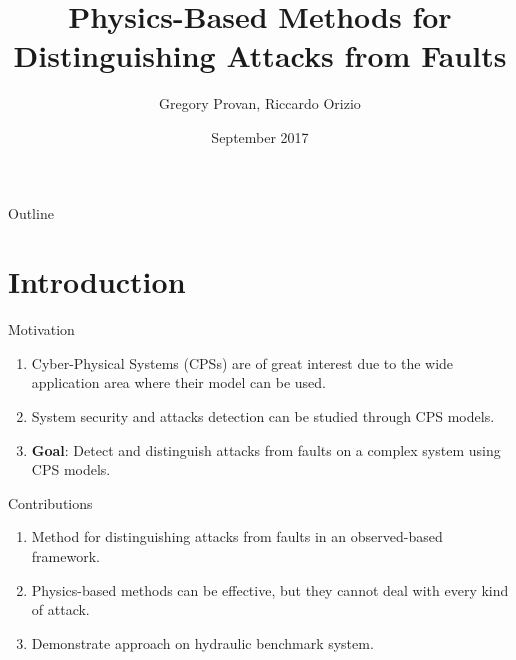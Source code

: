\documentclass{beamer}
\title[CENICS 2017]{Physics-Based Methods for Distinguishing Attacks from Faults}
\author[Provan G., Orizio R.]{\alert{Gregory Provan, Riccardo Orizio}}
\institute[UCC]{\alert{University College Cork}}
\date[September 2017]{\alert{September 2017}}
\def\itemizespace{\vspace{3mm}}
\begin{document}
\begin{frame}
	\titlepage
\end{frame}

\begin{frame}{Outline}
	\tableofcontents
\end{frame}


\section{Introduction}

\begin{frame}{Motivation}
	\begin{enumerate}
		\item \alert<+>{Cyber-Physical Systems (CPSs) are of great interest due
			to the wide application area where their model can be used.}

		\itemizespace

		\item \alert<+>{System security and attacks detection can be studied
			through CPS models.}

		\itemizespace

		\item \alert<+>{\textbf{Goal}: Detect and distinguish attacks from
			faults on a complex system using CPS models.}
	\end{enumerate}
\end{frame}

\begin{frame}{Contributions}
	\begin{enumerate}
		\item \alert<+>{Method for distinguishing attacks from faults in an
			observed-based framework.}

		\itemizespace

		\item \alert<+>{Physics-based methods can be effective, but they cannot
			deal with every kind of attack.}

		\itemizespace

		\item \alert<+>{Demonstrate approach on hydraulic benchmark system.}
	\end{enumerate}
\end{frame}

\end{document}
